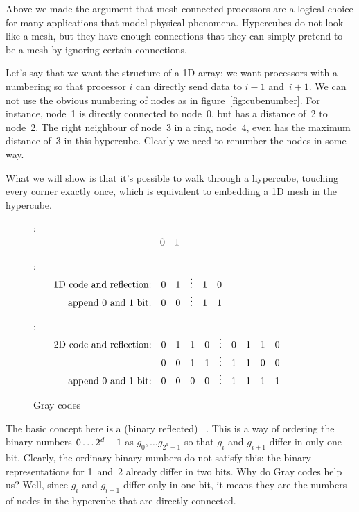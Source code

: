 Above we made the argument that mesh-connected processors are a
logical choice for many applications that model physical phenomena.
Hypercubes do not look like a mesh, but they have enough
connections that they can simply pretend to be a mesh by ignoring
certain connections. 

\begin{lulu}
\graycodepicture  
\end{lulu}
%
Let's say that we want the structure of a 1D array: we want processors
with a numbering so that processor $i$ can directly send data to $i-1$
and~$i+1$. We can not use the obvious numbering of
nodes as in figure~\ref{fig:cubenumber}. For instance, node~1 is
directly connected to node~0, but has a distance of~2 to node~2. The
right neighbour of node~3 in a ring, node~4, even has the maximum
distance of~3 in this hypercube. Clearly we need to renumber the nodes
in some way.

What we will show is that
it's possible to walk through a hypercube, touching
every corner exactly once, which is equivalent to embedding a 1D mesh
in the hypercube.

\begin{figure}[ht]
\hbox{:
$\vcenter{$
\begin{array}{rll}
  \hphantom{1D code and reflection:}&0&1\\
\end{array}$}
$}

\hbox{:
$\vcenter{$
\begin{array}{rccccc}
  \hbox{1D code and reflection:}&0&1&\vdots&1&0\\
  \hbox{append 0 and 1 bit:}&0&0&\vdots&1&1
\end{array}$}
$}

\hbox{:
$\vcenter{$
\begin{array}{rccccccccc}
  \hbox{2D code and reflection:}&0&1&1&0&\vdots&0&1&1&0\\
  &0&0&1&1&\vdots&1&1&0&0\\
  \hbox{append 0 and 1 bit:}&0&0&0&0&\vdots&1&1&1&1
\end{array}$}
$}

  \caption{Gray codes}
  \label{fig:graycode}
\end{figure}

\begin{notlulu}
  \graycodepicture
\end{notlulu}
%
The basic concept here is a (binary reflected) ~\cite{Gray:graycodepatent}. This is a way of ordering the
binary numbers $0\ldots2^d-\nobreak1$ as $g_0,\ldots g_{2^d-1}$ so that $g_i$
and $g_{i+1}$ differ in only one bit. Clearly, the ordinary binary
numbers do not satisfy this: the binary representations for 1~and~2
already differ in two bits. Why do Gray codes help us? Well, since
$g_i$ and $g_{i+1}$ differ only in one bit, it means they are the
numbers of nodes in the hypercube that are directly connected.

